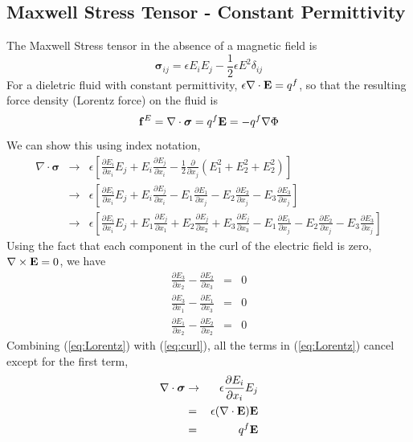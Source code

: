\documentclass[final]{siamltex}
\def\Eb {{\bf E}}
\def\fb {{\bf f}}
\def\sigmab {\boldsymbol{\sigma}}
\def\half   {\frac{1}{2}}
\begin{document}
\subsection{Maxwell Stress Tensor - Constant Permittivity}
The Maxwell Stress tensor in the absence of a magnetic field is
\begin{equation}
\sigmab_{ij} = \epsilon E_i E_j - \half\epsilon E^2 \delta_{ij}
\end{equation}
For a dieletric fluid with constant permittivity, $\epsilon\nabla\cdot\Eb = q^f$, so that
the resulting force density (Lorentz force) on the fluid is
\begin{equation}
\fb^E = \nabla\cdot\sigmab = q^f\Eb = -q^f\nabla\Phi
\end{equation}
We can show this using index notation,
\begin{eqnarray}
\nabla\cdot\sigmab &\rightarrow& \epsilon\left[\frac{\partial E_i}{\partial x_i}E_j + E_i\frac{\partial E_j}{\partial x_i} - \half\frac{\partial}{\partial x_j}\left(E_1^2 + E_2^2 + E_2^2\right)\right]\nonumber\\
&\rightarrow& \epsilon\left[\frac{\partial E_i}{\partial x_i}E_j + E_i\frac{\partial E_j}{\partial x_i} - E_1\frac{\partial E_1}{\partial x_j} - E_2\frac{\partial E_2}{\partial x_j} - E_3\frac{\partial E_3}{\partial x_j}\right]\nonumber\\
&\rightarrow& \epsilon\left[\frac{\partial E_i}{\partial x_i}E_j
+ E_1\frac{\partial E_j}{\partial x_1}
+ E_2\frac{\partial E_j}{\partial x_2}
+ E_3\frac{\partial E_j}{\partial x_3}
- E_1\frac{\partial E_1}{\partial x_j}
- E_2\frac{\partial E_2}{\partial x_j}
- E_3\frac{\partial E_3}{\partial x_j}\right]\label{eq:Lorentz}
\end{eqnarray}
Using the fact that each component in the curl of the electric field is zero,
$\nabla\times\Eb=0$, we have
\begin{eqnarray}
\frac{\partial E_3}{\partial x_2} - \frac{\partial E_2}{\partial x_3} &=& 0 \nonumber\\
\frac{\partial E_3}{\partial x_1} - \frac{\partial E_1}{\partial x_3} &=& 0 \nonumber\\
\frac{\partial E_1}{\partial x_2} - \frac{\partial E_2}{\partial x_2} &=& 0 \label{eq:curl}
\end{eqnarray}
Combining (\ref{eq:Lorentz}) with (\ref{eq:curl}), all the terms in (\ref{eq:Lorentz})
cancel except for the first term,
\begin{eqnarray}
\nabla\cdot\sigmab &\rightarrow& \epsilon\frac{\partial E_i}{\partial x_i}E_j \nonumber\\
&=& \epsilon (\nabla\cdot\Eb) \Eb \nonumber\\
&=& q^f\Eb
\end{eqnarray}
\end{document}
